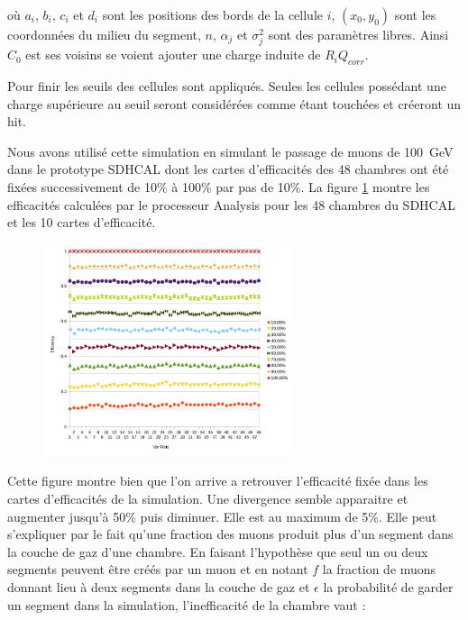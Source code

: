 où $a_i$, $b_i$, $c_i$ et $d_i$ sont les positions des bords de la cellule $i$, $(x_0,y_0)$ sont les coordonnées du milieu du segment, $n$, $\alpha_j$ et $\sigma_j^2$ sont des paramètres libres. Ainsi $C_0$ est ses voisins se voient ajouter une charge induite de $R_iQ_{corr}$.

Pour finir les seuils des cellules sont appliqués. Seules les cellules possédant une charge supérieure au seuil seront considérées comme étant touchées et créeront un hit.

Nous avons utilisé cette simulation en simulant le passage de muons de \SI{100}{\giga\eV} dans le prototype SDHCAL dont les cartes d'efficacités des \num{48} chambres ont été fixées successivement de 10\% à 100\% par pas de 10\%. La figure \ref{effisimul} montre les efficacités calculées par le processeur Analysis pour les \num{48} chambres du SDHCAL et les \num{10} cartes d'efficacité.

\begin{figure}[ht!]
	\centering
	\includegraphics[width=0.65\textwidth]{GLA/effisimul.jpg}
	\label{effisimul}
\end{figure}

Cette figure montre bien que l'on arrive a retrouver l'efficacité fixée dans les cartes d'efficacités de la simulation. Une divergence semble apparaitre et augmenter jusqu'à 50\% puis diminuer. Elle est au maximum de 5\%. Elle peut s'expliquer par le fait qu'une fraction des muons produit plus d'un segment dans la couche de gaz d'une chambre. En faisant l'hypothèse que seul un ou deux segments peuvent être créés par un muon et en notant $f$ la fraction de muons donnant lieu à deux segments dans la couche de gaz et $\epsilon$ la probabilité de garder un segment dans la simulation, l'inefficacité de la chambre vaut :


